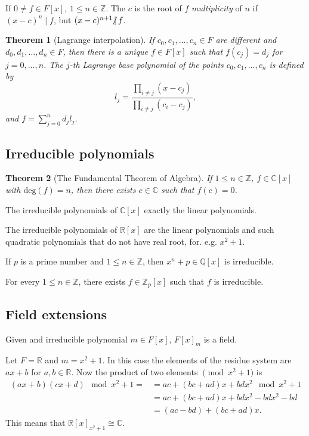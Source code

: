 \documentclass{article}
\newcommand{\Z}{\mathbb{Z}}
\newcommand{\nmid}{\hspace{-4pt}\not|\hspace{2pt}}
\newtheorem{theorem}{Theorem}
\begin{document}
If $0 \neq f \in F[x]$, $1 \le n \in \Z$. The $c$ is the root of $f$ \emph{multiplicity} of $n$ if $(x-c)^n \mid f$, but $(x-c)^{n+1} \nmid f$.

\begin{theorem}[Lagrange interpolation]
    If $c_0,c_1,\ldots,c_n \in F$ are different and $d_0,d_1,\ldots,d_n \in F$, then there is a unique $f\in F[x]$ such that $f(c_j) = d_j$ for $j=0,\ldots,n$.
    The $j$-th Lagrange base polynomial of the points $c_0,c_1,\ldots,c_n$ is defined by
    \[
        l_j = \frac{\prod_{i \neq j} (x - c_j)}{\prod_{i \neq j} (c_i - c_j)},
    \]
    and $f = \sum_{j=0}^n d_j l_j$.
\end{theorem}

\subsection{Irreducible polynomials}

\begin{theorem}[The Fundamental Theorem of Algebra]
    If $1 \le n \in \Z$, $f \in \mathbb{C}[x]$ with $\mathrm{deg}(f) = n$, then there exists $c\in\mathbb{C}$ such that $f(c) = 0$.
\end{theorem}

The irreducible polynomials of $\mathbb{C}[x]$ exactly the linear polynomials.

The irreducible polynomials of $\mathbb{R}[x]$ are the linear polynomials and such quadratic polynomials that do not have real root, for. e.g. $x^2 + 1$.

If $p$ is a prime number and $1 \le n \in \Z$, then $x^n + p \in \mathbb{Q}[x]$ is irreducible.

For every $1 \le n \in \Z$, there exists $f \in \Z_p[x]$ such that $f$ is irreducible.

\subsection{Field extensions}

Given and irreducible polynomial $m \in F[x]$, $F[x]_m$ is a field.

Let $F=\mathbb{R}$ and $m = x^2 + 1$. In this case the elements of the residue system are $ax+b$ for $a,b \in \mathbb{R}$.
Now the product of two elements $\pmod{x^2 + 1}$ is
\begin{align*}
    (ax + b)(cx + d) \mod x^2 + 1 = &= ac + (bc+ad)x + bdx^2 \mod x^2 + 1 \\
                                    &= ac + (bc+ad)x + bdx^2 - bdx^2 - bd \\
                                    &= (ac - bd) + (bc + ad)x.
\end{align*}
This means that $\mathbb{R}[x]_{x^2 + 1} \cong \mathbb{C}$.
\end{document}
